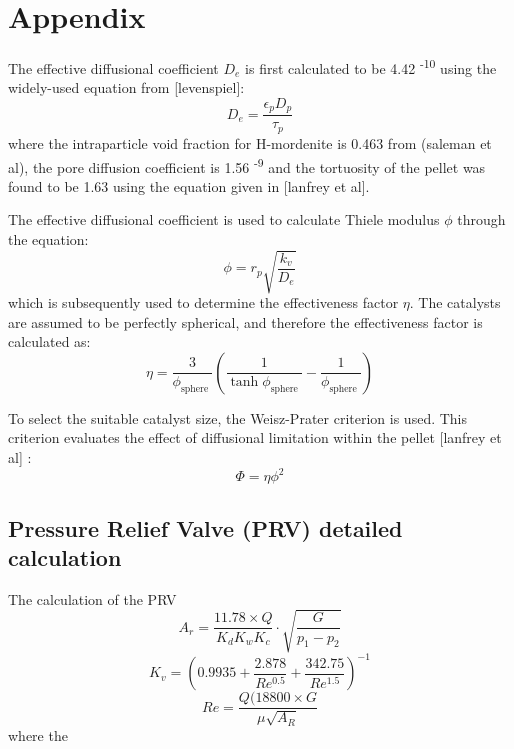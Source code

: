 \section{Appendix}
\label{app:reaction}

The effective diffusional coefficient $D_e$ is first calculated to be 4.42 \textsuperscript{-10} using the widely-used equation from [levenspiel]: 
\begin{equation}
    D_e = \frac{\epsilon_p D_p}{\tau_p}
\end{equation}
where the intraparticle void fraction for H-mordenite is 0.463 from (saleman et al), the pore diffusion coefficient is 1.56 \textsuperscript{-9} and the tortuosity of the pellet was found to be 1.63 using the equation given in [lanfrey et al]. 

The effective diffusional coefficient is used to calculate Thiele modulus $\phi$ through the equation:
\begin{equation}
    \phi = r_p \sqrt{\frac{k_v}{D_e}}
\end{equation}
which is subsequently used to determine the effectiveness factor $\eta$. The catalysts are assumed to be perfectly spherical, and therefore the effectiveness factor is calculated as: 
\begin{equation}
\eta=\frac{3}{\phi_{\text {sphere }}}\left(\frac{1}{\tanh \phi_{\text {sphere }}}-\frac{1}{\phi_{\text {sphere }}}\right)
\end{equation}

To select the suitable catalyst size, the Weisz-Prater criterion is used. This criterion evaluates the effect of diffusional limitation within the pellet [lanfrey et al] :
\begin{equation}
    \Phi = \eta \phi^2
\end{equation}



\subsection{Pressure Relief Valve (PRV) detailed calculation}
The calculation of the PRV 
\begin{equation}
    A_r = \frac{11.78 \times Q}{K_d K_w K_c} \cdot \sqrt{\frac{G}{p_1-p_2}}
\end{equation}
\begin{equation}
    K_v = (0.9935 + \frac{2.878}{Re^{0.5}} + \frac{342.75}{Re^{1.5}})^{-1}
\end{equation}
\begin{equation}
    Re = \frac{Q(18800 \times G}{\mu \sqrt{A_R}}
\end{equation}
where the